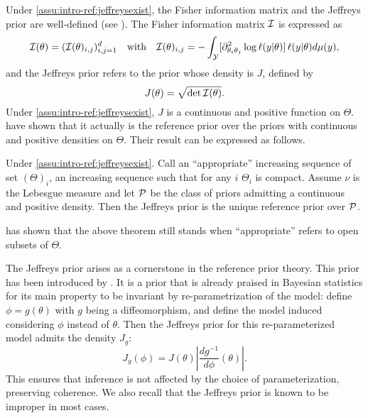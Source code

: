 Under \cref{assu:intro-ref:jeffreysexist}, the Fisher information matrix and the Jeffreys prior are well-defined (see \cite{lehmann_elements_1999}). The Fisher information matrix $\mathcal{I}$ is expressed as
    \begin{equation}
        \mathcal{I}(\theta) = (\mathcal{I}(\theta)_{i,j})_{i,j=1}^d\quad \text{with}\quad \mathcal{I}(\theta)_{i,j}= - \int_{\mathcal{Y}}[\partial^2_{\theta_i\theta_j}\log\ell(y|\theta)]\, \ell(y|\theta)d\mu(y),
    \end{equation}
and the Jeffreys prior refers to the prior whose density is $J$, defined by
    \begin{equation}
        J(\theta) = \sqrt{\det\mathcal{I}(\theta)}.
    \end{equation}
Under \cref{assu:intro-ref:jeffreysexist}, $J$ is a continuous and positive function on $\Theta$. \citet{clarke_jeffreys_1994} have shown that it actually is the reference prior over the priors with continuous and positive densities on $\Theta$. Their result can be expressed as follows.
    \begin{thm}\label{thm:intro-ref:clarke}
        Under \cref{assu:intro-ref:jeffreysexist}. Call an ``appropriate'' increasing sequence of set $(\Theta)_i$, an increasing sequence such that for any $i$ $\Theta_i$ is compact. Assume $\nu$ is the Lebesgue measure and let $\mathcal{P}$ be the class of priors admitting a continuous and positive density. Then the Jeffreys prior is the unique reference prior over $\mathcal{P}$.
    \end{thm}
\citet{mure_objective_2018} has shown that the above theorem still stands when ``appropriate'' refers to open subsets of $\Theta$.


The Jeffreys prior arises as a cornerstone in the reference prior theory.
This prior has been introduced by \citet{jeffreys_invariant_1946}. It is a prior that is already praised in Bayesian statistics for its main property to be invariant by re-parametrization of the model:
define $\phi=g(\theta)$ with $g$ being a diffeomorphism, and define the model induced considering $\phi$ instead of $\theta$. Then the Jeffreys prior for this re-parameterized model admits the density $J_g$:
    \begin{equation}
        J_g(\phi) = J(\theta) \left|\frac{dg^{-1}}{d\phi} (\theta)\right|.
    \end{equation}
This ensures that inference is not affected by the choice of parameterization, preserving coherence.
We also recall that the Jeffreys prior is known to be improper in most cases.


